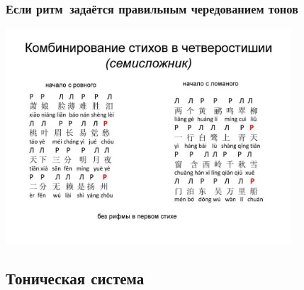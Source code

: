 \documentclass{beamer}
\begin{document}
\begin{frame}
\frametitle{Если ритм~задаётся правильным чередованием тонов}
\begin{center}
\includegraphics[width=0.8\textwidth]{cn.jpg}
\end{center}
\end{frame}


\subsection{Тоническая система}\label{sec:ton}
\end{document}
